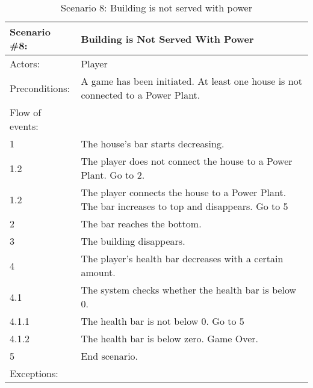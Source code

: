 \begin{table}
	\begin{tabular}{| l | p{10cm} |}
		\hline
		\rowcolor{lightgray}
		{\bf Scenario \#8:} & {\bf Building is Not Served With Power} \\ \hline
		Actors: & Player \\ \hline
		Preconditions: & A game has been initiated. At least one house is not connected to a Power Plant. \\ \hline
		\rowcolor{lightergray}
		Flow of events: & \\ \hline
		1 & The house's bar starts decreasing. \\ \hline
		1.2 & The player does not connect the house to a Power Plant. Go to 2. \\ \hline
		1.2 & The player connects the house to a Power Plant. The bar increases to top and disappears. Go to 5 \\ \hline
		2 & The bar reaches the bottom. \\ \hline
		3 & The building disappears. \\ \hline
		4 & The player's health bar decreases with a certain amount. \\ \hline
		4.1 & The system checks whether the health bar is below 0. \\ \hline
		4.1.1 & The health bar is not below 0. Go to 5 \\ \hline
		4.1.2 & The health bar is below zero. Game Over. \\ \hline
		5 & End scenario. \\ \hline
		\rowcolor{lightergray}
		Exceptions: & \\ \hline	
	\end{tabular}
	\caption{Scenario 8: Building is not served with power}
\end{table}

